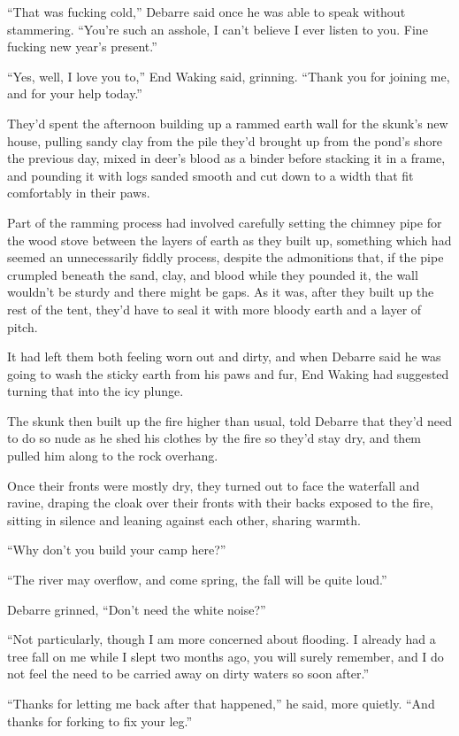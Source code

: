 ``That was fucking cold,'' Debarre said once he was able to speak without stammering. ``You're such an asshole, I can't believe I ever listen to you. Fine fucking new year's present.''

``Yes, well, I love you to,'' End Waking said, grinning. ``Thank you for joining me, and for your help today.''

They'd spent the afternoon building up a rammed earth wall for the skunk's new house, pulling sandy clay from the pile they'd brought up from the pond's shore the previous day, mixed in deer's blood as a binder before stacking it in a frame, and pounding it with logs sanded smooth and cut down to a width that fit comfortably in their paws.

Part of the ramming process had involved carefully setting the chimney pipe for the wood stove between the layers of earth as they built up, something which had seemed an unnecessarily fiddly process, despite the admonitions that, if the pipe crumpled beneath the sand, clay, and blood while they pounded it, the wall wouldn't be sturdy and there might be gaps. As it was, after they built up the rest of the tent, they'd have to seal it with more bloody earth and a layer of pitch.

It had left them both feeling worn out and dirty, and when Debarre said he was going to wash the sticky earth from his paws and fur, End Waking had suggested turning that into the icy plunge.

The skunk then built up the fire higher than usual, told Debarre that they'd need to do so nude as he shed his clothes by the fire so they'd stay dry, and them pulled him along to the rock overhang.

Once their fronts were mostly dry, they turned out to face the waterfall and ravine, draping the cloak over their fronts with their backs exposed to the fire, sitting in silence and leaning against each other, sharing warmth.

``Why don't you build your camp here?''

``The river may overflow, and come spring, the fall will be quite loud.''

Debarre grinned, ``Don't need the white noise?''

``Not particularly, though I am more concerned about flooding. I already had a tree fall on me while I slept two months ago, you will surely remember, and I do not feel the need to be carried away on dirty waters so soon after.''

``Thanks for letting me back after that happened,'' he said, more quietly. ``And thanks for forking to fix your leg.''

